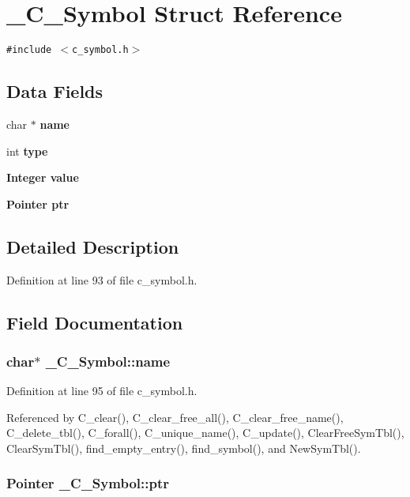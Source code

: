 \section{\_\-C\_\-Symbol Struct Reference}
\label{struct__C__Symbol}
{\tt \#include $<$c\_\-symbol.h$>$}

\subsection*{Data Fields}
\begin{CompactItemize}
\item 
char $\ast$ \bf{name}
\item 
int \bf{type}
\item 
\bf{Integer} \bf{value}
\item 
\bf{Pointer} \bf{ptr}
\end{CompactItemize}


\subsection{Detailed Description}




Definition at line 93 of file c\_\-symbol.h.

\subsection{Field Documentation}
\subsubsection{\setlength{\rightskip}{0pt plus 5cm}char$\ast$ \bf{\_\-C\_\-Symbol::name}}\label{struct__C__Symbol_c17d45195760af19817fa39a8931e1d8}




Definition at line 95 of file c\_\-symbol.h.

Referenced by C\_\-clear(), C\_\-clear\_\-free\_\-all(), C\_\-clear\_\-free\_\-name(), C\_\-delete\_\-tbl(), C\_\-forall(), C\_\-unique\_\-name(), C\_\-update(), Clear\-Free\-Sym\-Tbl(), Clear\-Sym\-Tbl(), find\_\-empty\_\-entry(), find\_\-symbol(), and New\-Sym\-Tbl().
\subsubsection{\setlength{\rightskip}{0pt plus 5cm}\bf{Pointer} \bf{\_\-C\_\-Symbol::ptr}}\label{struct__C__Symbol_f1ef5957700fdfa04d0c57eba4aa8ada}




